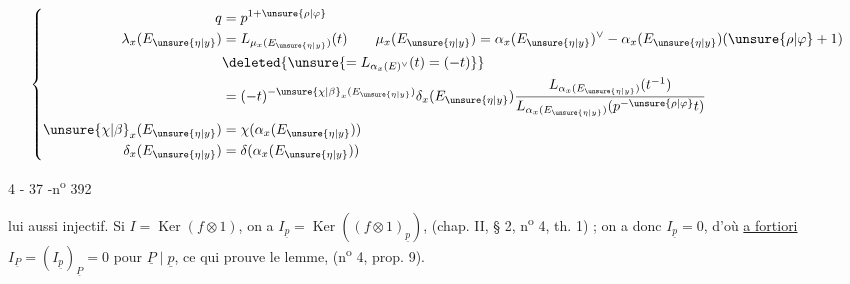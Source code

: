 \[
\left\{\begin{aligned}
q&=p^{1+\unsure{\rho|\varphi}}\\
\lambda_x(E_{\unsure{\eta|y}})&=L_{\mu_x(E_{\unsure{\eta|y}})}(t)\qquad
\mu_x(E_{\unsure{\eta|y}})=\alpha_x(E_{\unsure{\eta|y}})^\vee-\alpha_x(E_{\unsure{\eta|y}})(\unsure{\rho|\varphi}+1)\\
&\deleted{\unsure{=L_{\alpha_x(E)^\vee}(t)=(-t)}}\\
&=(-t)^{-\unsure{\chi|\beta}_x(E_{\unsure{\eta|y}})}\delta_x(E_{\unsure{\eta|y}})\frac{L_{\alpha_x(E_{\unsure{\eta|y}})}(t^{-1})}{L_{\alpha_x(E_{\unsure{\eta|y}})}(p^{-\unsure{\rho|\varphi}}t)}\\
\unsure{\chi|\beta}_x(E_{\unsure{\eta|y}})&=\chi(\alpha_x(E_{\unsure{\eta|y}}))\\
\delta_x(E_{\unsure{\eta|y}})&=\delta(\alpha_x(E_{\unsure{\eta|y}}))
\end{aligned}\right.
\]

\begin{center}4 - 37 -\hfill n\textsuperscript{o} 392\end{center}

lui aussi injectif. Si $I=\operatorname{Ker}(f\otimes1)$, on a $I_{\underline{p}}=\operatorname{Ker}((f\otimes1)_{\underline{p}})$, (chap. II, § 2, n\textsuperscript{o} 4, th. 1) ; on a donc $I_{\underline{p}}=0$, d'où \uline{a fortiori} $I_{\underline{P}}=(I_{\underline{p}})_{\underline{P}}=0$ pour $\underline{P}\mid\underline{p}$, ce qui prouve le lemme, (n\textsuperscript{o} 4, prop. 9).

